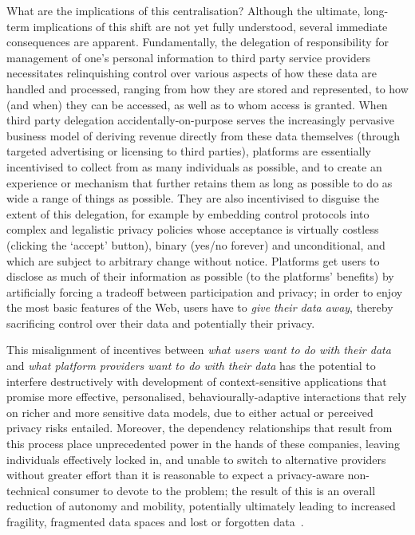 \documentclass[graybox]{svmult}
\begin{document}
What are the implications of this centralisation?  Although the ultimate, long-term implications of this shift are not yet fully understood, several immediate consequences are apparent. Fundamentally, the delegation of responsibility for management of one's personal information to third party service providers necessitates relinquishing control over various aspects of how these data are handled and processed, ranging from how they are stored and represented, to how (and when) they can be accessed, as well as to whom access is granted.  When third party delegation accidentally-on-purpose serves the increasingly pervasive business model of deriving revenue directly from these data themselves (through targeted advertising or licensing to third parties), platforms are essentially incentivised to collect from as many individuals as possible, and to create an experience or mechanism that further retains them as long as possible to do as wide a range of things as possible. They are also incentivised to disguise the extent of this delegation, for example by embedding control protocols into complex and legalistic privacy policies whose acceptance is virtually costless (clicking the `accept' button), binary (yes/no forever) and unconditional, and which are subject to arbitrary change without notice. Platforms get users to disclose as much of their information as possible (to the platforms' benefits) by artificially forcing a tradeoff between participation and privacy; in order to enjoy the most basic features of the Web, users have to \emph{give their data away}, thereby sacrificing control over their data and potentially their privacy.

This misalignment of incentives between \emph{what users want to do with their data} and \emph{what platform providers want to do with their data} has the potential to interfere destructively with development of context-sensitive applications that promise more effective, personalised, behaviourally-adaptive interactions that rely on richer and more sensitive data models, due to either actual or perceived privacy risks entailed.  Moreover, the dependency relationships that result from this process place unprecedented power in the hands of these companies, leaving individuals effectively locked in, and unable to switch to alternative providers without greater effort than it is reasonable to expect a privacy-aware non-technical consumer to devote to the problem; the result of this is an overall reduction of autonomy and mobility, potentially ultimately leading to increased fragility, fragmented data spaces and lost or forgotten data~\cite{whittaker2001character, odom2012technology}.
\end{document}
